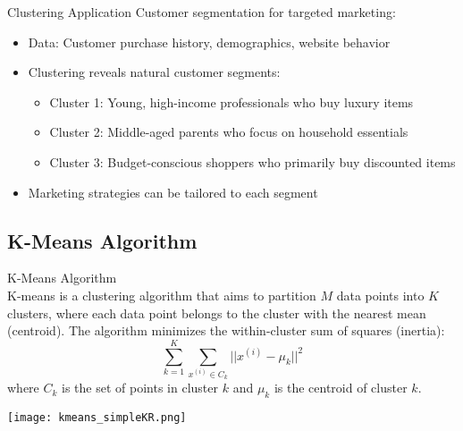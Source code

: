 \begin{example}{Clustering Application}
Customer segmentation for targeted marketing:
\begin{itemize}
    \item Data: Customer purchase history, demographics, website behavior
    \item Clustering reveals natural customer segments:
    \begin{itemize}
        \item Cluster 1: Young, high-income professionals who buy luxury items
        \item Cluster 2: Middle-aged parents who focus on household essentials
        \item Cluster 3: Budget-conscious shoppers who primarily buy discounted items
    \end{itemize}
    \item Marketing strategies can be tailored to each segment
\end{itemize}
\end{example}

\subsection{K-Means Algorithm}

\begin{definition}{K-Means Algorithm}\\
K-means is a clustering algorithm that aims to partition $M$ data points into $K$ clusters, where each data point belongs to the cluster with the nearest mean (centroid). The algorithm minimizes the within-cluster sum of squares (inertia):
\[\sum_{k=1}^{K} \sum_{x^{(i)} \in C_k} ||x^{(i)} - \mu_k||^2\]
where $C_k$ is the set of points in cluster $k$ and $\mu_k$ is the centroid of cluster $k$.

\texttt{[image: kmeans\_simpleKR.png]}
\end{definition}


